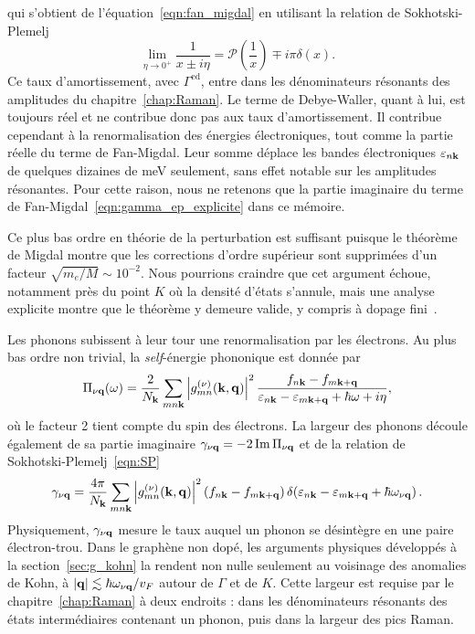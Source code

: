 qui s'obtient de l'équation~\eqref{eqn:fan_migdal} en utilisant la relation de Sokhotski-Plemelj
\begin{equation}
    \lim_{\eta\to0^+}\frac{1}{x\pm i\eta} = \mathcal{P}\left(\frac{1}{x}\right)\mp i\pi\delta(x).\label{eqn:SP}
\end{equation}
Ce taux d'amortissement, avec $\Gamma^\text{ed}$, entre dans les dénominateurs résonants des amplitudes du chapitre~\ref{chap:Raman}. Le terme de Debye-Waller, quant à lui, est toujours réel et ne contribue donc pas aux taux d'amortissement. Il contribue cependant à la renormalisation des énergies électroniques, tout comme la partie réelle du terme de Fan-Migdal. Leur somme déplace les bandes électroniques $\varepsilon_{n\mathbf{k}}$ de quelques dizaines de meV seulement, sans effet notable sur les amplitudes résonantes. Pour cette raison, nous ne retenons que la partie imaginaire du terme de Fan-Migdal~\eqref{eqn:gamma_ep_explicite} dans ce mémoire.

Ce plus bas ordre en théorie de la perturbation est suffisant puisque le théorème de Migdal montre que les corrections d'ordre supérieur sont supprimées d'un facteur $\sqrt{m_e/M}\sim 10^{-2}$. Nous pourrions craindre que cet argument échoue, notamment près du point $K$ où la densité d'états s'annule, mais une analyse explicite montre que le théorème y demeure valide, y compris à dopage fini~\cite{royMigdalsTheoremElectronphonon2014}.

Les phonons subissent à leur tour une renormalisation par les électrons. Au plus bas ordre non trivial, la \textit{self}-énergie phononique est donnée par
\begin{equation}
    \Pi_{\nu\mathbf{q}}(\omega) = \frac{2}{N_{\mathbf{k}}}\sum_{mn\mathbf{k}}
    \left|g_{mn}^{(\nu)}(\mathbf{k},\mathbf{q})\right|^2
    \frac{f_{n\mathbf{k}}-f_{m\mathbf{k}+\mathbf{q}}}{\varepsilon_{n\mathbf{k}}-\varepsilon_{m\mathbf{k}+\mathbf{q}}+\hbar\omega+i\eta},
    \label{eqn:pi_phonon}
\end{equation}
où le facteur 2 tient compte du spin des électrons. La largeur des phonons découle également de sa partie imaginaire $\gamma_{\nu\mathbf{q}} = -2\,\mathrm{Im}\,\Pi_{\nu\mathbf{q}}$ et de la relation de Sokhotski-Plemelj~\eqref{eqn:SP}
\begin{equation}
        \gamma_{\nu\mathbf{q}} = \frac{4\pi}{N_{\mathbf{k}}}\sum_{mn\mathbf{k}}
    \left|g_{mn}^{(\nu)}(\mathbf{k},\mathbf{q})\right|^2
    \left(f_{n\mathbf{k}}-f_{m\mathbf{k}+\mathbf{q}}\right)
    \delta\!\left(\varepsilon_{n\mathbf{k}}-\varepsilon_{m\mathbf{k}+\mathbf{q}}+\hbar\omega_{\nu\mathbf{q}}\right).
    \label{eqn:gamma_phonon_explicite}
\end{equation}
Physiquement, $\gamma_{\nu\mathbf{q}}$ mesure le taux auquel un phonon se désintègre en une paire électron-trou. Dans le graphène non dopé, les arguments physiques développés à la section~\ref{sec:g_kohn} la rendent non nulle seulement au voisinage des anomalies de Kohn, à $|\mathbf{q}|\lesssim \hbar\omega_{\nu\mathbf{q}}/v_F$ autour de $\Gamma$ et de $K$. Cette largeur est requise par le chapitre~\ref{chap:Raman} à deux endroits : dans les dénominateurs résonants des états intermédiaires contenant un phonon, puis dans la largeur des pics Raman.

